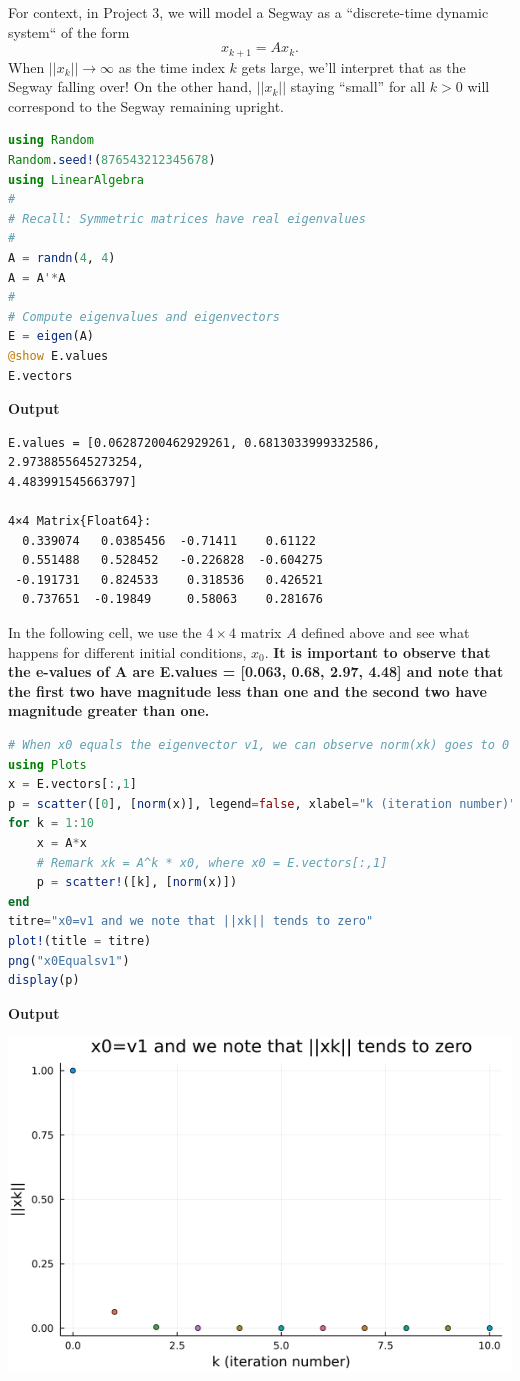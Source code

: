 For context, in Project 3, we will model a Segway as a ``discrete-time dynamic system`` of the form $$x_{k+1} = A x_k.$$ When $||x_k|| \to \infty$ as the time index $k$ gets large, we'll interpret that as the Segway falling over! On the other hand, $||x_k||$ staying ``small'' for all $k>0$ will correspond to the Segway remaining upright.\\


\begin{lstlisting}[language=Julia,style=mystyle]
using Random
Random.seed!(876543212345678)
using LinearAlgebra
#
# Recall: Symmetric matrices have real eigenvalues
#
A = randn(4, 4)
A = A'*A
#
# Compute eigenvalues and eigenvectors
E = eigen(A)
@show E.values
E.vectors
\end{lstlisting}
\textbf{Output} 
\begin{verbatim}
E.values = [0.06287200462929261, 0.6813033999332586, 2.9738855645273254, 
4.483991545663797]

4×4 Matrix{Float64}:
  0.339074   0.0385456  -0.71411    0.61122
  0.551488   0.528452   -0.226828  -0.604275
 -0.191731   0.824533    0.318536   0.426521
  0.737651  -0.19849     0.58063    0.281676
\end{verbatim}

In the following cell, we use the  $4 \times 4$ matrix $A$  defined above and see what happens for different initial conditions,  $x_0$. \textbf{It is important to observe that the e-values of A are E.values = [0.063, 0.68, 2.97, 4.48] and note that the first two have magnitude less than one and the second two have magnitude greater than one.}\\

\begin{lstlisting}[language=Julia,style=mystyle]
# When x0 equals the eigenvector v1, we can observe norm(xk) goes to 0
using Plots
x = E.vectors[:,1]
p = scatter([0], [norm(x)], legend=false, xlabel="k (iteration number)", ylabel="||xk||")
for k = 1:10
    x = A*x 
    # Remark xk = A^k * x0, where x0 = E.vectors[:,1]
    p = scatter!([k], [norm(x)])
end
titre="x0=v1 and we note that ||xk|| tends to zero"
plot!(title = titre)
png("x0Equalsv1")
display(p)
\end{lstlisting}
\textbf{Output} 

\begin{center}
\includegraphics[width=0.6\columnwidth]{graphics/Chap08/x0Equalsv1.png} 
\end{center}

